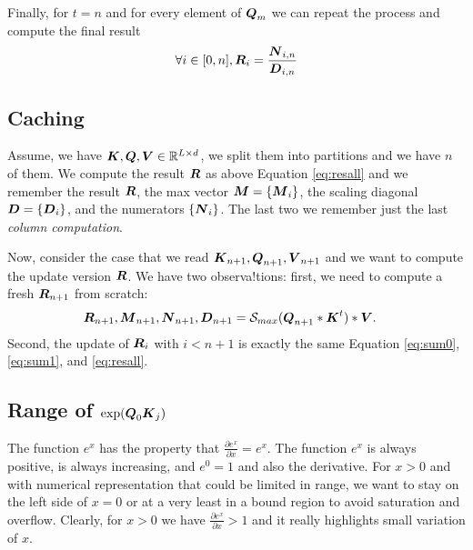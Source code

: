 \documentclass[journal]{IEEEtran}
\begin{document}
Finally, for $t=n$ and for every element of ${\boldsymbol Q}_m$ we can repeat
the process and compute the final result
\begin{equation}
  \label{eq:resall}
 \forall i \in [0,n],\/ \Vc{R}_i = \frac{\Vc{N}_{i,n}}{\Vc{D}_{i,n}}
\end{equation}
\begin{comment}
Each $\Vc{R}_i$ are independent.  Space requirements: $\Vc{Q}_i,
\Vc{K}_i, \Vc{V}_i \in \R^{d \times d}$,, $\Vc{Q}_i\Vc{K}_j \in
\R^{d\times d}$, $\exp\Vc{Q}_i\Vc{K}_j \in \R^{d\times d}$
$\Vc{D}_{0,i} \in \R^{d}$, $\Vc{N}_{0,t}\Vc{N}_{0,t+1} \in \R^{d
  \times d}$.

We need to keep in memory $\Vc{D}_{0,t}$ and $\Vc{N}_{0,t}$, we
compute $\exp{\Vc{Q}_0\Vc{K}_{t+1}}$ to add to $\Vc{D}_{0,t}$, we then
compute $(\exp{\Vc{Q}_0\Vc{K}_{t+1}})\Vc{V}_{t+1}$. We need 5 matrices
of size $d \times d$. We store $\Vc{D}_{0,t+1}$ and $\Vc{N}_{0,t+1}$.
\end{comment}

\subsection{Caching}
Assume, we have ${\boldsymbol K},{\boldsymbol Q},{\boldsymbol V} \in \mathbb{R} ^{L\times d}$, we split
them into partitions and we have $n$ of them.  We compute the result
${\boldsymbol R}$ as above Equation \ref{eq:resall} and we remember the result
${\boldsymbol R}$, the max vector ${\boldsymbol M} = \{{\boldsymbol M}_i\}$, the scaling diagonal
$ {\boldsymbol D} = \{ {\boldsymbol D}_{i} \}$, and the numerators
$\{{\boldsymbol N}_{i}\}$. The last two we remember just the last {\em column
  computation}.

Now, consider the case that we read
${\boldsymbol K}_{n+1},{\boldsymbol Q}_{n+1},{\boldsymbol V}_{n+1}$ and we want to compute the
update version ${\boldsymbol R}$. We have two observa!tions: first, we need to
compute a fresh ${\boldsymbol R}_{n+1}$ from scratch:
\begin{align}
  \Vc{R}_{n+1},\Vc{M}_{n+1},\Vc{N}_{n+1}, \Vc{D}_{n+1} &= \Smax{\Vc{Q}_{n+1}*\Vc{K}^t}*\Vc{V}.
\end{align}
Second, the update of ${\boldsymbol R}_i$ with $i<n+1$ is exactly the same
Equation \ref{eq:sum0}, \ref{eq:sum1}, and \ref{eq:resall}.



\subsection{Range of $\exp({\boldsymbol Q}_0{\boldsymbol K}_j)$}
\label{sec:range}
The function $e^x$ has the property that $\frac{\partial e^x}{\partial
  x}= e^x$. The function $e^x$ is always positive, is always
increasing, and $e^0=1$ and also the derivative. For $x>0$ and with
numerical representation that could be limited in range, we want to
stay on the left side of $x=0$ or at a very least in a bound region to
avoid saturation and overflow. Clearly, for $x>0$ we have
$\frac{\partial e^x}{\partial x}>1$ and it really highlights small
variation of $x$.
\end{document}
